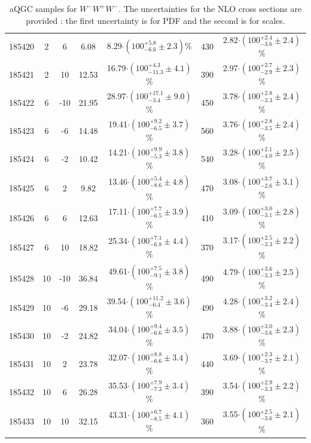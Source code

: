 \begin{table}[ht!]
{\begin{tabular}{c|c|c|c|c|c|c}
185420 & 2     &  6   &  6.08    &    8.29$\cdot (100^{+5.8}_{-6.6}\pm 2.3 )$\%    &    430       &           2.82$\cdot (100^{+2.4}_{-3.6}\pm 2.4 )$\%\\
185421 & 2     &  10  &  12.53   &    16.79$\cdot (100^{+4.3}_{-11.3}\pm 4.1 )$\%   &    390       &           2.97$\cdot (100^{+2.7}_{-2.9}\pm 2.3 )$\%\\
\hline
185422 & 6     &  -10 &  21.95   &    28.97$\cdot (100^{+17.1}_{-3.4}\pm 9.0 )$\%   &    450       &           3.78$\cdot (100^{+2.8}_{-3.3}\pm 2.4 )$\%\\ 
185423 & 6     &  -6  &  14.48   &    19.41$\cdot (100^{+9.2}_{-6.5}\pm 3.7 )$\%   &    560       &           3.76$\cdot (100^{+2.8}_{-3.5}\pm 2.4)$\%\\
185424 & 6     &  -2  &  10.42   &    14.21$\cdot (100^{+9.9}_{-5.3}\pm 3.8 )$\%   &    540       &           3.28$\cdot (100^{+2.1}_{-4.0}\pm 2.5)$\%\\
185425 & 6     &  2   &  9.82    &    13.46$\cdot (100^{+5.4}_{-8.6}\pm 4.8 )$\%   &    470       &           3.08$\cdot (100^{+3.7}_{-2.6}\pm 3.1)$\%\\
185426 & 6     &  6   &  12.63   &    17.11$\cdot (100^{+7.7}_{-6.5}\pm 3.9 )$\%   &    410       &           3.09$\cdot (100^{+3.0}_{-3.1}\pm 2.8 )$\% \\
185427 & 6     &  10  &  18.82   &    25.34$\cdot (100^{+7.1}_{-6.8}\pm 4.4 )$\%   &    370       &           3.17$\cdot (100^{+2.5}_{-3.3}\pm 2.2)$\% \\
\hline
185428 & 10    &  -10 &  36.84   &    49.61$\cdot (100^{+7.5}_{-9.1}\pm  3.8)$\%   &    490       &           4.79$\cdot (100^{+3.6}_{-3.3}\pm 2.5)$\%\\
185429 & 10    &  -6  &  29.18   &    39.54$\cdot (100^{+11.2}_{-6.4}\pm 3.6 )$\%   &    490       &           4.28$\cdot (100^{+3.2}_{-3.4}\pm 2.4 )$\%\\
185430 & 10    &  -2  &  24.82   &    34.04$\cdot (100^{+9.4}_{-6.6}\pm 3.5 )$\%   &    470       &           3.88$\cdot (100^{+3.0}_{-3.6}\pm 2.3)$\%\\
185431 & 10    &  2   &  23.78   &    32.07$\cdot (100^{+8.8}_{-6.6}\pm 3.4 )$\%   &    440       &           3.69$\cdot (100^{+2.3}_{-3.7}\pm 2.1)$\%\\
185432 & 10    &  6   &  26.28   &    35.53$\cdot (100^{+7.9}_{-7.3}\pm 3.4 )$\%   &    390       &           3.54$\cdot (100^{+2.9}_{-3.3}\pm 2.2)$\%\\
185433 &  10   &  10  &  32.15   &    43.31$\cdot (100^{+6.7}_{-8.5}\pm 4.1 )$\%   &    360       &           3.55$\cdot (100^{+2.5}_{-3.6}\pm 2.1)$\%\\
\hline 
\end{tabular}
}
\caption{aQGC samples for $W^-W^+W^-$. The uncertainties for the NLO cross sections are provided : the first uncertainty is for PDF and the second is for scales.}
\label{tab:signalNormaMMP}
\end{table}


